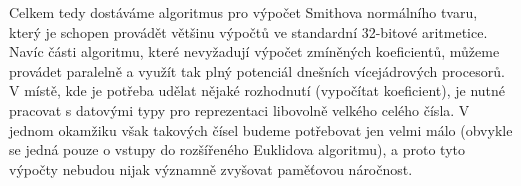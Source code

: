 Celkem tedy dostáváme algoritmus pro výpočet Smithova normálního tvaru, který
je schopen provádět většinu výpočtů ve standardní 32-bitové aritmetice. Navíc části
algoritmu, které nevyžadují výpočet zmíněných koeficientů, můžeme provádet
paralelně a využít tak plný potenciál dnešních vícejádrových procesorů.
V místě, kde je potřeba udělat nějaké rozhodnutí (vypočítat koeficient),
je nutné pracovat s datovými typy pro reprezentaci libovolně velkého celého
čísla. V jednom okamžiku však takových čísel budeme potřebovat jen velmi málo
(obvykle se jedná pouze o vstupy do rozšířeného Euklidova algoritmu), a proto
tyto výpočty nebudou nijak významně zvyšovat paměťovou náročnost.
